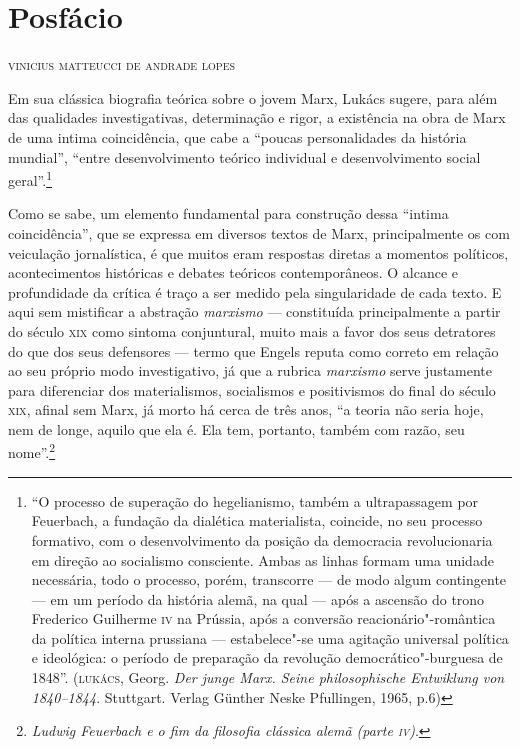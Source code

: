 \pagebreak
\thispagestyle{empty}
\movetooddpage
\chapter[Posfácio]{Posfácio }

\begin{flushright}
\textsc{vinicius matteucci de andrade lopes}
\end{flushright}

\noindent{}Em sua clássica biografia teórica sobre o jovem Marx, Lukács sugere,
para além das qualidades investigativas, determinação e rigor, a
existência na obra de Marx de uma intima coincidência, que cabe a
``poucas personalidades da história mundial'', ``entre desenvolvimento
teórico individual e desenvolvimento social geral''.\footnote{``O
  processo de superação do hegelianismo, também a ultrapassagem por
  Feuerbach, a fundação da dialética materialista, coincide, no seu
  processo formativo, com o desenvolvimento da posição da democracia
  revolucionaria em direção ao socialismo consciente. Ambas as linhas
  formam uma unidade necessária, todo o processo, porém, transcorre ---
  de modo algum contingente --- em um período da história alemã, na qual
  --- após a ascensão do trono Frederico Guilherme \textsc{iv} na
  Prússia, após a conversão reacionário"-romântica da política interna
  prussiana --- estabelece"-se uma agitação universal política e
  ideológica: o período de preparação da revolução democrático"-burguesa
  de 1848''. (\textsc{lukács}, Georg. \emph{Der junge Marx. Seine
  philosophische Entwiklung von 1840--1844}. Stuttgart. Verlag Günther
  Neske Pfullingen, 1965, p.6)}

Como se sabe, um elemento fundamental para construção dessa ``intima
coincidência'', que se expressa em diversos textos de Marx,
principalmente os com veiculação jornalística, é que muitos eram
respostas diretas a momentos políticos, acontecimentos históricas e
debates teóricos contemporâneos. O alcance e profundidade da crítica é
traço a ser medido pela singularidade de cada texto. E aqui sem
mistificar a abstração \emph{marxismo} --- constituída principalmente a
partir do século \textsc{xix} como sintoma conjuntural, muito mais a
favor dos seus detratores do que dos seus defensores --- termo que
Engels reputa como correto em relação ao seu próprio modo investigativo,
já que a rubrica \emph{marxismo} serve justamente para diferenciar dos
materialismos, socialismos e positivismos do final do século
\textsc{xix}, afinal sem Marx, já morto há cerca de três anos, ``a
teoria não seria hoje, nem de longe, aquilo que ela é. Ela tem,
portanto, também com razão, seu nome''.\footnote{\emph{Ludwig Feuerbach
  e o fim da filosofia clássica alemã (parte \textsc{iv})}.}

